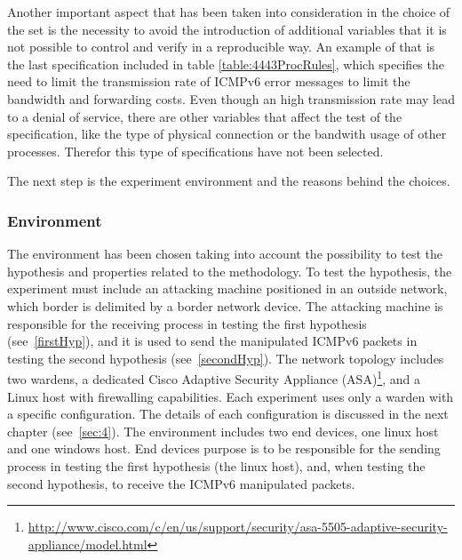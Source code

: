 \documentclass[12pt]{article}
\begin{document}
Another important aspect that has been taken into consideration in the choice of the set is the necessity to avoid the introduction of additional variables that it is not possible to control and verify in a reproducible way. An example of that is the last specification included in table \ref{table:4443ProcRules}, which specifies the need to limit the transmission rate of ICMPv6 error messages to limit the bandwidth and forwarding costs. Even though an high transmission rate may lead to a denial of service, there are other variables that affect the test of the specification, like the type of physical connection or the bandwith usage of other processes. Therefor this type of specifications have not been selected.

The next step is the experiment environment and the reasons behind the choices.

\subsubsection{Environment}
\label{subsub:enviroment}

The environment has been chosen taking into account the possibility to test the hypothesis and properties related to the methodology. To test the hypothesis, the experiment must include an attacking machine positioned in an outside network, which border is delimited by a border network device. The attacking machine is responsible for the receiving process in testing the first hypothesis (see~\ref{firstHyp}), and it is used to send the manipulated ICMPv6 packets in testing the second hypothesis (see~\ref{secondHyp}). The network topology includes two wardens, a dedicated Cisco Adaptive Security Appliance (ASA)\footnote{\url{http://www.cisco.com/c/en/us/support/security/asa-5505-adaptive-security-appliance/model.html}}, and a Linux host with firewalling capabilities. Each experiment uses only a warden with a specific configuration. The details of each configuration is discussed in the next chapter (see~\ref{sec:4}). The environment includes two end devices, one linux host and one windows host. End devices purpose is to be responsible for the sending process in testing the first hypothesis (the linux host), and, when testing the second hypothesis, to receive the ICMPv6 manipulated packets.
\end{document}
